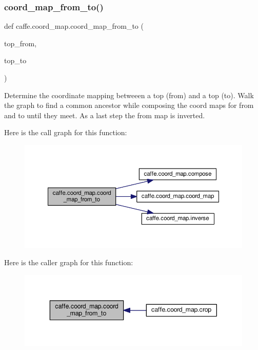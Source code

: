 \subsubsection{\texorpdfstring{coord\+\_\+map\+\_\+from\+\_\+to()}{coord\_map\_from\_to()}}
{\footnotesize\ttfamily def caffe.\+coord\+\_\+map.\+coord\+\_\+map\+\_\+from\+\_\+to (\begin{DoxyParamCaption}\item[{}]{top\+\_\+from,  }\item[{}]{top\+\_\+to }\end{DoxyParamCaption})}

\begin{DoxyVerb}Determine the coordinate mapping betweeen a top (from) and a top (to).
Walk the graph to find a common ancestor while composing the coord maps for
from and to until they meet. As a last step the from map is inverted.
\end{DoxyVerb}
 Here is the call graph for this function\+:
\nopagebreak
\begin{figure}[H]
\begin{center}
\leavevmode
\includegraphics[width=350pt]{namespacecaffe_1_1coord__map_abf9ba4c31e6e4f0bcd3130ea9001514b_cgraph}
\end{center}
\end{figure}
Here is the caller graph for this function\+:
\nopagebreak
\begin{figure}[H]
\begin{center}
\leavevmode
\includegraphics[width=343pt]{namespacecaffe_1_1coord__map_abf9ba4c31e6e4f0bcd3130ea9001514b_icgraph}
\end{center}
\end{figure}
\mbox{\label{namespacecaffe_1_1coord__map_aca9f1366a027d686a27d150e054296ee}} 
